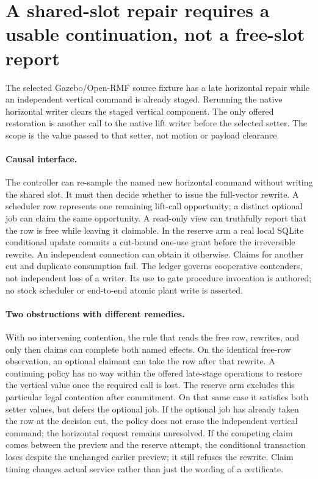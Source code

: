 \documentclass{article}
\begin{document}
\section*{A shared-slot repair requires a usable continuation, not a free-slot report}
The selected Gazebo/Open-RMF source fixture has a late horizontal
repair while an independent vertical command is already staged.
Rerunning the native horizontal writer clears the staged vertical
component. The only offered restoration is another call to the
native lift writer before the selected setter. The scope is the
value passed to that setter, not motion or payload clearance.

\paragraph{Causal interface.}
The controller can re-sample the named new horizontal command
without writing the shared slot. It must then decide whether to
issue the full-vector rewrite. A scheduler row represents one
remaining lift-call opportunity; a distinct optional job can claim
the same opportunity. A read-only view can truthfully report that
the row is free while leaving it claimable. In the reserve arm a
real local SQLite conditional update commits a cut-bound one-use
grant before the irreversible rewrite. An independent connection
can obtain it otherwise. Claims for another cut and duplicate
consumption fail. The ledger governs cooperative contenders, not
independent loss of a writer. Its use to gate procedure invocation
is authored; no stock scheduler or end-to-end atomic plant write
is asserted.

\paragraph{Two obstructions with different remedies.}
With no intervening contention, the rule that reads the free row,
rewrites, and only then claims can complete both named effects.
On the identical free-row observation, an optional claimant can
take the row after that rewrite. A continuing policy has no way
within the offered late-stage operations to restore the vertical
value once the required call is lost. The reserve arm excludes
this particular legal contention after commitment. On that same
case it satisfies both setter values, but defers the optional job.
If the optional job has already taken the row at the decision cut,
the policy does not erase the independent vertical command; the
horizontal request remains unresolved. If the competing claim comes between the preview and the
reserve attempt, the conditional transaction loses despite the
unchanged earlier preview; it still refuses the rewrite.
Claim timing changes actual
service rather than just the wording of a certificate.
\end{document}
